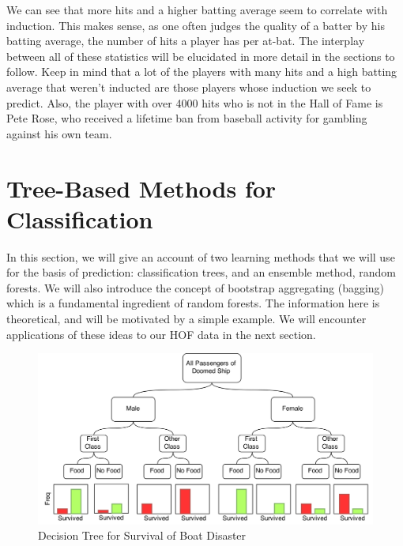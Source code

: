 \documentclass[preprint,12pt]{elsarticle}
\begin{document}
We can see that more hits and a higher batting average seem to correlate with induction. This makes sense, as one often judges the quality of a batter by his batting average, the number of hits a player has per at-bat. The interplay between all of these statistics will be elucidated in more detail in the sections to follow. Keep in mind that a lot of the players with many hits and a high batting average that weren't inducted are those players whose induction we seek to predict. Also, the player with over 4000 hits who is not in the Hall of Fame is Pete Rose, who received a lifetime ban from baseball activity for gambling against his own team.







\section{Tree-Based Methods for Classification}
\label{method}

In this section, we will give an account of two learning methods that we will use for the basis of prediction: classification trees, and an ensemble method, random forests. We will also introduce the concept of bootstrap aggregating (bagging) which is a fundamental ingredient of random forests. The information here is theoretical, and will be motivated by a simple example. We will encounter applications of these ideas to our HOF data in the next section.
\begin{figure}[h]
	\centering
	\includegraphics[width=1\textwidth]{TreeExample}
	\caption{Decision Tree for Survival of Boat Disaster}
	\label{fig:SampleTree}
\end{figure}
\end{document}
